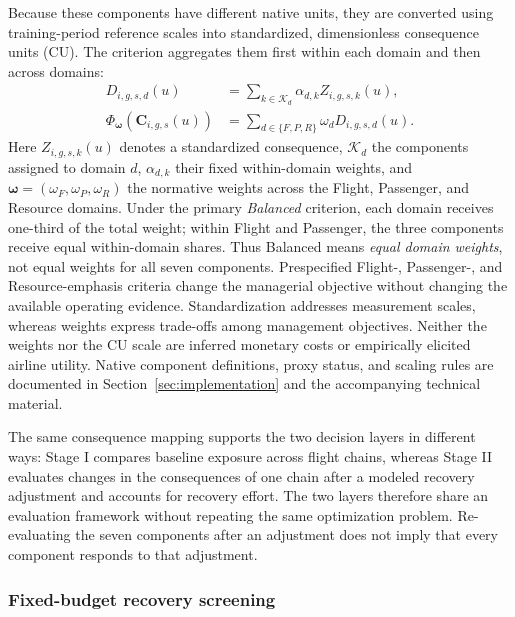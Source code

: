 Because these components have different native units, they are converted using training-period reference scales into standardized, dimensionless consequence units (CU). The criterion aggregates them first within each domain and then across domains:
\begin{equation}
\begin{aligned}
D_{i,g,s,d}(u)
&=\sum_{k\in\mathcal K_d}\alpha_{d,k}Z_{i,g,s,k}(u),\\
\Phi_{\boldsymbol\omega}\!\left(\mathbf C_{i,g,s}(u)\right)
&=\sum_{d\in\{F,P,R\}}\omega_dD_{i,g,s,d}(u).
\end{aligned}
\label{eq:consequence_criterion_sec3}
\end{equation}
Here $Z_{i,g,s,k}(u)$ denotes a standardized consequence, $\mathcal K_d$ the components assigned to domain $d$, $\alpha_{d,k}$ their fixed within-domain weights, and $\boldsymbol\omega=(\omega_F,\omega_P,\omega_R)$ the normative weights across the Flight, Passenger, and Resource domains. Under the primary \emph{Balanced} criterion, each domain receives one-third of the total weight; within Flight and Passenger, the three components receive equal within-domain shares. Thus Balanced means \emph{equal domain weights}, not equal weights for all seven components. Prespecified Flight-, Passenger-, and Resource-emphasis criteria change the managerial objective without changing the available operating evidence. Standardization addresses measurement scales, whereas weights express trade-offs among management objectives. Neither the weights nor the CU scale are inferred monetary costs or empirically elicited airline utility. Native component definitions, proxy status, and scaling rules are documented in Section~\ref{sec:implementation} and the accompanying technical material.

The same consequence mapping supports the two decision layers in different ways: Stage I compares baseline exposure across flight chains, whereas Stage II evaluates changes in the consequences of one chain after a modeled recovery adjustment and accounts for recovery effort. The two layers therefore share an evaluation framework without repeating the same optimization problem. Re-evaluating the seven components after an adjustment does not imply that every component responds to that adjustment.

\subsubsection{Fixed-budget recovery screening}

